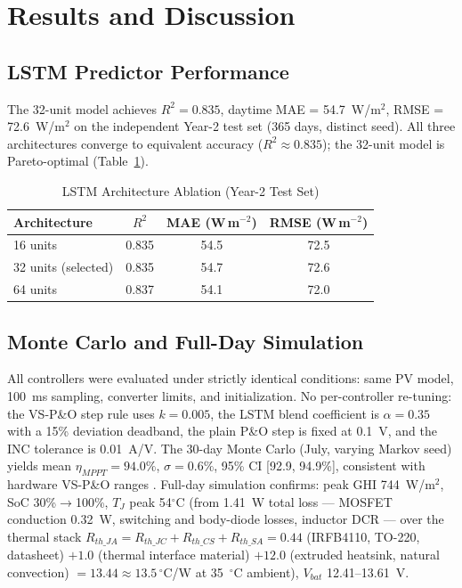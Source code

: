 \documentclass{iaesarticle}
\begin{document}
\section{Results and Discussion}

\subsection{LSTM Predictor Performance}

The 32-unit model achieves $R^2 = 0.835$, daytime MAE = 54.7~W/m$^2$, RMSE = 72.6~W/m$^2$ on the independent Year-2 test set (365 days, distinct seed). All three architectures converge to equivalent accuracy ($R^2 \approx 0.835$); the 32-unit model is Pareto-optimal (Table~\ref{tab:ablation}).

\begin{table}[H]
\centering
\caption{LSTM Architecture Ablation (Year-2 Test Set)}
\label{tab:ablation}
\small
\begin{tabular}{lccc}
\toprule
Architecture & $R^2$ & MAE (W\,m$^{-2}$) & RMSE (W\,m$^{-2}$) \\
\midrule
16 units & 0.835 & 54.5 & 72.5 \\
32 units (selected) & 0.835 & 54.7 & 72.6 \\
64 units & 0.837 & 54.1 & 72.0 \\
\bottomrule
\end{tabular}
\end{table}

\subsection{Monte Carlo and Full-Day Simulation}

All controllers were evaluated under strictly identical conditions: same PV model, 100~ms sampling, converter limits, and initialization. No per-controller re-tuning: the VS-P\&O step rule uses $k = 0.005$, the LSTM blend coefficient is $\alpha = 0.35$ with a 15\% deviation deadband, the plain P\&O step is fixed at 0.1~V, and the INC tolerance is 0.01~A/V. The 30-day Monte Carlo (July, varying Markov seed) yields mean $\eta_{MPPT} = 94.0\%$, $\sigma = 0.6\%$, 95\% CI [92.9, 94.9\%], consistent with hardware VS-P\&O ranges \cite{tey2014,esram2007}. Full-day simulation confirms: peak GHI 744~W/m$^2$, SoC 30\%$\rightarrow$100\%, $T_J$ peak 54$^\circ$C (from 1.41~W total loss --- MOSFET conduction 0.32~W, switching and body-diode losses, inductor DCR --- over the thermal stack $R_{th\_JA} = R_{th\_JC} + R_{th\_CS} + R_{th\_SA} = 0.44$ (IRFB4110, TO-220, datasheet) $+ 1.0$ (thermal interface material) $+ 12.0$ (extruded heatsink, natural convection) $= 13.44 \approx 13.5\,^\circ$C/W at 35~$^\circ$C ambient), $V_{bat}$ 12.41--13.61~V.
\end{document}
